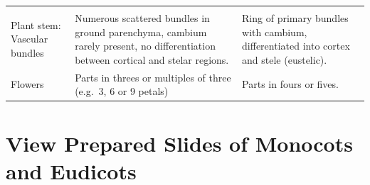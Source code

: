 \documentclass[]{book}
\theoremstyle{definition}
\theoremstyle{definition}
\theoremstyle{definition}
\theoremstyle{remark}
\begin{document}
\begin{longtable}[]{@{}lll@{}}
\begin{minipage}[t]{0.13\columnwidth}
\end{minipage}\tabularnewline
\begin{minipage}[t]{0.10\columnwidth}\raggedright\strut
Plant stem: Vascular bundles\strut
\end{minipage} & \begin{minipage}[t]{0.15\columnwidth}\raggedright\strut
Numerous scattered bundles in ground parenchyma, cambium rarely present,
no differentiation between cortical and stelar regions.\strut
\end{minipage} & \begin{minipage}[t]{0.13\columnwidth}\raggedright\strut
Ring of primary bundles with cambium, differentiated into cortex and
stele (eustelic).\strut
\end{minipage}\tabularnewline
\begin{minipage}[t]{0.10\columnwidth}\raggedright\strut
Flowers\strut
\end{minipage} & \begin{minipage}[t]{0.15\columnwidth}\raggedright\strut
Parts in threes or multiples of three (e.g.~3, 6 or 9 petals)\strut
\end{minipage} & \begin{minipage}[t]{0.13\columnwidth}\raggedright\strut
Parts in fours or fives.\strut
\end{minipage}\tabularnewline
\bottomrule
\end{longtable}

\section{View Prepared Slides of Monocots and
Eudicots}\label{view-prepared-slides-of-monocots-and-eudicots}
\end{document}
